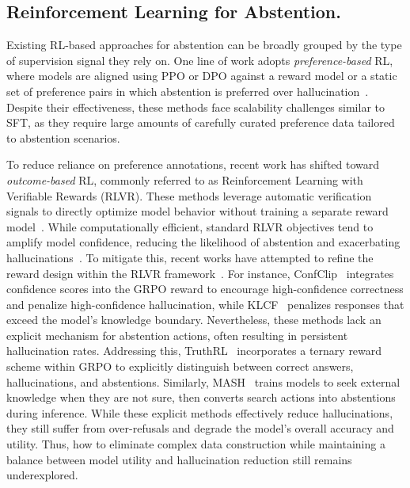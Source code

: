\documentclass{article} %
\begin{document}
\subsection{Reinforcement Learning for Abstention.}
Existing RL-based approaches for abstention can be broadly grouped by the type of supervision signal they rely on.
One line of work adopts \emph{preference-based} RL, where models are aligned using PPO or DPO against a reward model or a static set of preference pairs in which abstention is preferred over hallucination~\citep{HH-RLHF,LLMsKnowWhatTheyKnow,Rejection_Improves_Reliability}.
Despite their effectiveness, these methods face scalability challenges similar to SFT, as they require large amounts of carefully curated preference data tailored to abstention scenarios.

To reduce reliance on preference annotations, recent work has shifted toward \emph{outcome-based} RL, commonly referred to as Reinforcement Learning with Verifiable Rewards (RLVR).
These methods leverage automatic verification signals to directly optimize model behavior without training a separate reward model~\citep{DeepSeekMath,Deepseek-r1}.
While computationally efficient, standard RLVR objectives tend to amplify model confidence, reducing the likelihood of abstention and exacerbating hallucinations~\citep{NIPS-RL,TheHallucinationTax}.
To mitigate this, recent works have attempted to refine the reward design within the RLVR framework~\citep{Teaching}.
For instance, ConfClip~\citep{ConfClip} integrates confidence scores into the GRPO reward to encourage high-confidence correctness and penalize high-confidence hallucination, while KLCF~\citep{KLCF} penalizes responses that exceed the model's knowledge boundary.
Nevertheless, these methods lack an explicit mechanism for abstention actions, often resulting in persistent hallucination rates.
Addressing this, TruthRL~\citep{truthrl} incorporates a ternary reward scheme within GRPO to explicitly distinguish between correct answers, hallucinations, and abstentions.
Similarly, MASH~\citep{MASH} trains models to seek external knowledge when they are not sure, then converts search actions into abstentions during inference.
While these explicit methods effectively reduce hallucinations, they still suffer from over-refusals and degrade the model's overall accuracy and utility.
Thus, how to eliminate complex data construction while maintaining a balance between model utility and hallucination reduction still remains underexplored.
\end{document}
